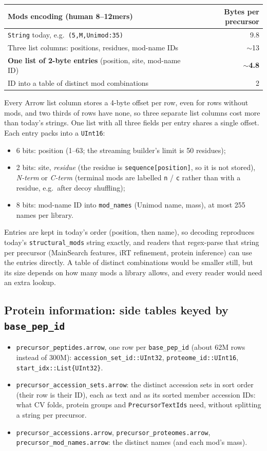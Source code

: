 \documentclass[10pt]{article}
\newcommand{\code}[1]{\texttt{#1}}
\begin{document}
\begin{center}\small
\begin{tabular}{l r}
\toprule
Mods encoding (human 8--12mers) & Bytes per precursor \\
\midrule
\code{String} today, e.g.\ \code{(5,M,Unimod:35)} & 9.8 \\
Three list columns: positions, residues, mod-name IDs & $\sim$13 \\
\textbf{One list of 2-byte entries} (position, site, mod-name ID) & \textbf{$\sim$4.8} \\
ID into a table of distinct mod combinations & 2 \\
\bottomrule
\end{tabular}
\end{center}

Every Arrow list column stores a 4-byte offset per row, even for rows without mods, and two thirds of rows have
none, so three separate list columns cost more than today's strings. One list with all three fields per entry shares
a single offset. Each entry packs into a \code{UInt16}:
\begin{itemize}
\item 6 bits: position (1--63; the streaming builder's limit is 50 residues);
\item 2 bits: site, \emph{residue} (the residue is \code{sequence[position]}, so it is not stored), \emph{N-term}
  or \emph{C-term} (terminal mods are labelled \code{n} / \code{c} rather than with a residue, e.g.\ after decoy
  shuffling);
\item 8 bits: mod-name ID into \code{mod\_names} (Unimod name, mass), at most 255 names per library.
\end{itemize}
Entries are kept in today's order (position, then name), so decoding reproduces today's \code{structural\_mods}
string exactly, and readers that regex-parse that string per precursor (MainSearch features, iRT refinement, protein
inference) can use the entries directly. A table of distinct combinations would be smaller still, but its size depends
on how many mods a library allows, and every reader would need an extra lookup.

\subsection*{Protein information: side tables keyed by \code{base\_pep\_id}}
\begin{itemize}
\item \code{precursor\_peptides.arrow}, one row per \code{base\_pep\_id} (about 62M rows instead of 300M):
  \code{accession\_set\_id::UInt32}, \code{proteome\_id::UInt16}, \code{start\_idx::List\{UInt32\}}.
\item \code{precursor\_accession\_sets.arrow}: the distinct accession sets in sort order (their row is their ID),
  each as text and as its sorted member accession IDs: what CV folds, protein groups and \code{PrecursorTextIds} need,
  without splitting a string per precursor.
\item \code{precursor\_accessions.arrow}, \code{precursor\_proteomes.arrow}, \code{precursor\_mod\_names.arrow}:
  the distinct names (and each mod's mass).
\end{itemize}
\end{document}
